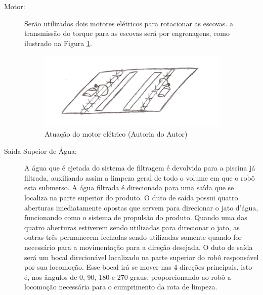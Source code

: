 \begin{description}
\item[Motor:] Serão utilizados dois motores elétricos para rotacionar as escovas.
a transmissão do torque para as escovas será por engrenagens, como ilustrado na
Figura \ref{fig:eletric-motor}.
\par
\begin{figure}[h]
  \centering
  \includegraphics[width=0.9\textwidth]{figures/eletric-motor.png}
  \caption{Atuação do motor elétrico (\textsf{Autoria do Autor})}
  \label{fig:eletric-motor}
\end{figure}
\FloatBarrier

\item[Saída Supeior de Água:] A água que é ejetada do sistema de filtragem é
devolvida para a piscina já filtrada, auxiliando assim a limpeza geral de todo
o volume em que o robô esta submerso. A água filtrada é direcionada para uma
saída que se localiza na parte superior do produto. O duto de saída possui quatro
aberturas imediatamente opostas que servem para direcionar o jato d’água,
funcionando como o sistema de propulsão do produto. Quando uma das quatro aberturas
estiverem sendo utilizadas para direcionar o jato, as outras três permanecem
fechadas sendo utilizadas somente quando for necessário para a movimentação para a
direção desejada. O duto de saída será um bocal direcionável localizado na
parte superior do robô responsável por sua locomoção. Esse bocal irá se mover
nas 4 direções principais, isto é, nos ângulos de 0, 90, 180 e 270 graus,
proporcionando ao robô a locomoção necessária para o cumprimento da rota de limpeza.


\end{description}
